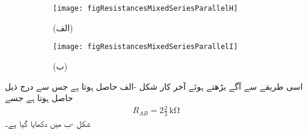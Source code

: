 \begin{figure}
\centering
\begin{subfigure}{0.5\textwidth}
\centering
\texttt{[image: figResistancesMixedSeriesParallelH]}
\caption*{(الف)}
\end{subfigure}%
\begin{subfigure}{0.5\textwidth}
\centering
\texttt{[image: figResistancesMixedSeriesParallelI]}
\caption*{(ب)}
\end{subfigure}%
\caption{}
\label{مشق_مزاحمتی_سلسلہ_وار_متوازی_مزاحمت_ث}
\end{figure}

اسی طریقے سے آگے بڑھتے ہوئے آخر کار شکل -الف حاصل ہوتا ہے جس سے  درج ذیل حاصل ہوتا ہے جسے  
\begin{align*}
R_{AB}=2\frac{2}{3}\, \si{\kilo\ohm}
\end{align*}
شکل -ب میں دکھایا گیا ہے۔
